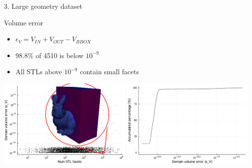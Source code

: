 \documentclass{beamer}
\begin{document}
\begin{frame}{3. Large geometry dataset}

  \begin{block}{Volume error}
  \begin{itemize}
    \item
      $\epsilon_V = V_{IN} + V_{OUT} - V_{BBOX}$
    \item
      98.8\% of 4510 is below $10^{-9}$
    \item
      All STLs above $10^{-9}$ contain small facets
  \end{itemize}
  \end{block}

  \includegraphics[width=0.49\textwidth]{num_stl_facets_volume_error_bunny}
  \includegraphics[width=0.49\textwidth]{../analysis/plots/histogram_volume_error}
\end{frame}
\end{document}
